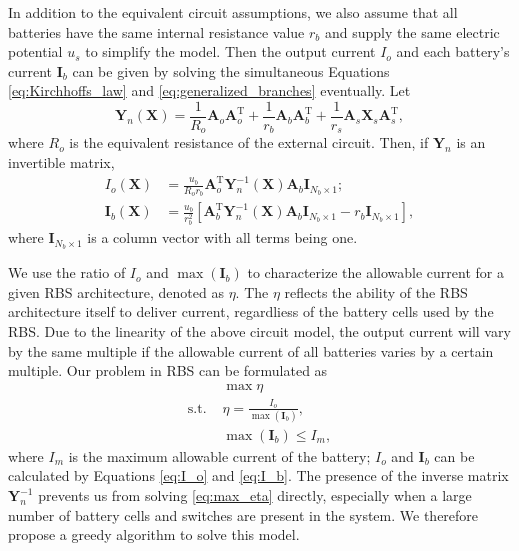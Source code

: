 \documentclass{article}
\def\T{\mathrm{T}}
\begin{document}
In addition to the equivalent circuit assumptions, we also assume that all batteries have the same internal resistance value $r_b$ and supply the same electric potential $u_s$ to simplify the model.
Then the output current $I_o$ and each battery's current $\bm{I}_b$ can be given by solving the simultaneous Equations \ref{eq:Kirchhoffs_law} and \ref{eq:generalized_branches} eventually.
Let
\begin{equation}\label{eq:Yn}
    \bm{Y}_n (\bm{X}) = \frac{1}{R_o} \bm{A}_o\bm{A}_o^\T + \frac{1}{r_b} \bm{A}_b\bm{A}_b^\T + \frac{1}{r_s}\bm{A}_s\bm{X}_s\bm{A}_s^\T,
\end{equation}
where $R_o$ is the equivalent resistance of the external circuit.
Then, if $\bm{Y}_n$ is an invertible matrix, 
\begin{align}
    I_o(\bm{X})      & = \frac{u_b}{R_o r_b} \bm{A}_o^\T \bm{Y}_n^{-1}(\bm{X}) \bm{A}_b \bm{I}_{N_b\times 1};\label{eq:I_o}\\
    \bm{I}_b(\bm{X}) & = \frac{u_b}{r_b^2}[\bm{A}_b^\T \bm{Y}_n^{-1}(\bm{X}) \bm{A}_b\bm{I}_{N_b \times 1}  -r_b \bm{I}_{N_b \times 1}],\label{eq:I_b}
\end{align}
where $\bm{I}_{N_b\times 1}$ is a column vector with all terms being one.


We use the ratio of $I_o$ and $\max (\bm{I}_b)$ to characterize the allowable current for a given RBS architecture, denoted as $\eta$.
The $\eta$ reflects the ability of the RBS architecture itself to deliver current, regardliess of the battery cells used by the RBS.
Due to the linearity of the above circuit model, the output current will vary by the same multiple if the allowable current of all batteries varies by a certain multiple.
Our problem in RBS can be formulated as
\begin{align}
        & \max \eta \label{eq:max_eta}\\
    \mathrm{s.t.}\,\, & \eta = \frac{I_o}{\max (\bm{I}_b)}, \\
        & \max (\bm{I}_b) \leq I_m,
\end{align}
where $I_m$ is the maximum allowable current of the battery; $I_o$ and $\bm{I}_b$ can be calculated by Equations \ref{eq:I_o} and \ref{eq:I_b}.
The presence of the inverse matrix $\bm{Y}_n^{-1}$ prevents us from solving \ref{eq:max_eta} directly, especially when a large number of battery cells and switches are present in the system.
We therefore propose a greedy algorithm to solve this model.
\end{document}
